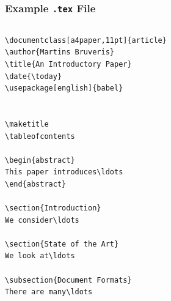 \begin{frame}[fragile]
\frametitle{Example \texttt{.tex} File}
\setlength{\fboxsep}{.5em}

\begin{columns}[T]
\begin{column}{.48\textwidth}
\begin{beamerboxesrounded}[width=\linewidth]{}
\vspace{-1em}
\begin{lstlisting}[moretexcs={maketitle,tableofcontents,subsection},
emph={document,abstract,babel},
basicstyle={\ttfamily\footnotesize\lsstyle},lineskip=-2pt]
\documentclass[a4paper,11pt]{article}
\author{Martins Bruveris}
\title{An Introductory Paper}
\date{\today}
\usepackage[english]{babel}


\maketitle
\tableofcontents

\begin{abstract}
This paper introduces\ldots
\end{abstract}

\section{Introduction}
We consider\ldots

\section{State of the Art}
We look at\ldots

\subsection{Document Formats}
There are many\ldots

\end{lstlisting}
\vspace{-1em}
\end{beamerboxesrounded}
\end{column}


\end{columns}
\end{frame}

